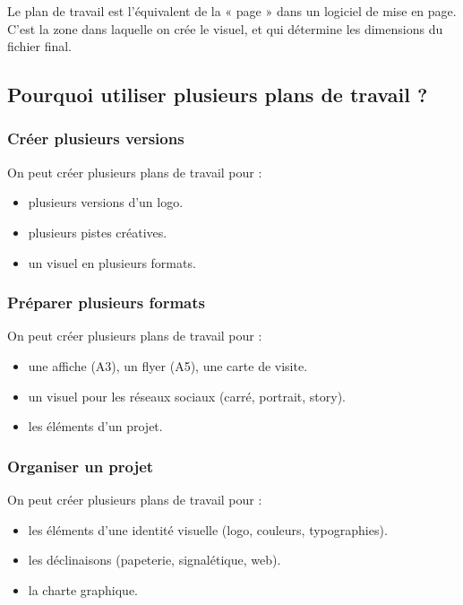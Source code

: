 Le plan de travail est l'équivalent de la « page » dans un logiciel de mise en page. C'est la zone dans laquelle on crée le visuel, et qui détermine les dimensions du fichier final.

\subsection{Pourquoi utiliser plusieurs plans de travail ?}

\subsubsection{Créer plusieurs versions}

On peut créer plusieurs plans de travail pour :

\begin{itemize}
    \item {} plusieurs versions d'un logo.
    \item {} plusieurs pistes créatives.
    \item {} un visuel en plusieurs formats.
\end{itemize}

\subsubsection{Préparer plusieurs formats}

On peut créer plusieurs plans de travail pour :

\begin{itemize}
    \item {} une affiche (A3), un flyer (A5), une carte de visite.
    \item {} un visuel pour les réseaux sociaux (carré, portrait, story).
    \item {} les éléments d'un projet.
\end{itemize}

\subsubsection{Organiser un projet}

On peut créer plusieurs plans de travail pour :

\begin{itemize}
    \item {} les éléments d'une identité visuelle (logo, couleurs, typographies).
    \item {} les déclinaisons (papeterie, signalétique, web).
    \item {} la charte graphique.
\end{itemize}

